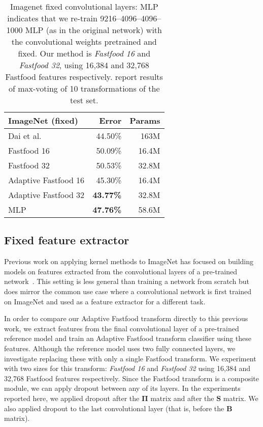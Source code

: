 \documentclass[10pt,twocolumn,letterpaper]{article}
\newcommand{\myvec}[1]{\mathbf{#1}}
\newcommand{\myvecsym}[1]{\boldsymbol{#1}}
\newcommand{\vPi}{\myvecsym{\Pi}}
\newcommand{\vB}{\myvec{B}}
\newcommand{\vS}{\myvec{S}}
\begin{document}
\begin{table}[th]
  \centering
  \begin{tabular}{l|r|r}
    ImageNet (fixed) & Error & Params\\
    \hline
    Dai et al.~\cite{song:2014} & 44.50\% & 163M \\
    Fastfood 16 & 50.09\% & 16.4M\\ Fastfood 32 & 50.53\% & 32.8M\\ Adaptive Fastfood 16 & 45.30\% & 16.4M\\
    Adaptive Fastfood 32 & \textbf{43.77\%} & 32.8M\\
    \hline
    MLP & \textbf{47.76\%} & 58.6M\\ \end{tabular}
  \caption{Imagenet fixed convolutional layers:
    {MLP} indicates that we re-train
    9216--4096--4096--1000 MLP (as in the original network)
    with the convolutional weights pretrained and fixed. Our method is
    \emph{Fastfood 16} and \emph{Fastfood 32}, using 16,384 and
    32,768 Fastfood features respectively.
    \cite{song:2014} report results of max-voting of 10 transformations of
    the test set.}
  \label{tab:imagenet_fixed}
\end{table}

\subsection{Fixed feature extractor}

Previous work on applying kernel methods to ImageNet has focused on building models on features extracted from the convolutional layers of a pre-trained network~\cite{song:2014}.  This setting is less general than training a network from scratch but does mirror the common use case where a convolutional network is first trained on ImageNet and used as a feature extractor for a different task.  

In order to compare our Adaptive Fastfood transform directly to this previous work, we extract features from the final convolutional layer of a pre-trained reference model and train an Adaptive Fastfood transform classifier using these features.  Although the reference model uses two fully connected layers, we
investigate replacing these with only a single Fastfood transform. We experiment with two sizes for this transform: \emph{Fastfood 16} and \emph{Fastfood 32} using 16,384 and
    32,768 Fastfood features respectively. Since the Fastfood transform is a composite module, we can apply dropout between any of its layers. In the experiments reported here, we applied dropout after the $\vPi$ matrix and after the $\vS$ matrix. We also applied dropout to the last convolutional layer (that is, before the $\vB$ matrix). 
\end{document}
